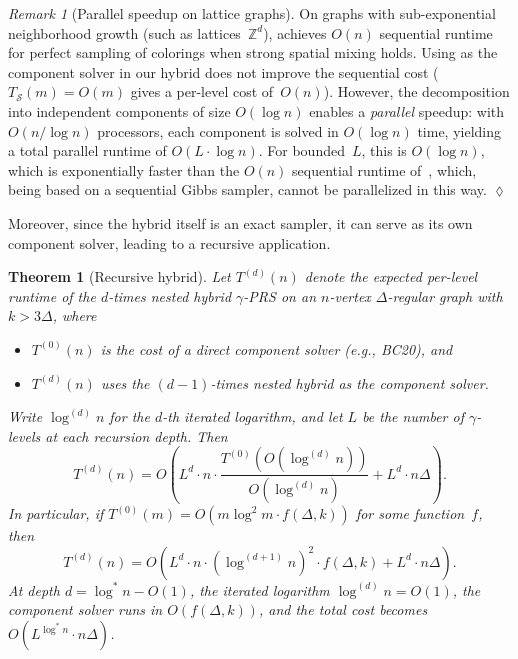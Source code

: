 \documentclass[12pt, a4paper]{article}
\theoremstyle{plain}
\newtheorem{theorem}{Theorem}
\theoremstyle{definition}
\theoremstyle{remark}
\newtheorem{remark}{Remark}
\newcommand{\intg}{\mathbb{Z}}
\newcommand{\mc}{\mathcal}
\newcommand{\lt}{\left}
\newcommand{\rt}{\right}
\begin{document}
\begin{remark}[Parallel speedup on lattice graphs]\normalfont\label{rem:lattice-parallel}
On graphs with sub-exponential neighborhood growth (such as lattices~\(\intg^d\)), \cite{FGY22} achieves \(O(n)\) sequential runtime for perfect sampling of colorings when strong spatial mixing holds. Using \cite{FGY22} as the component solver in our hybrid does not improve the sequential cost (\(T_{\mc S}(m)=O(m)\) gives a per-level cost of~\(O(n)\)). However, the decomposition into independent components of size \(O(\log n)\) enables a {\em parallel} speedup: with \(O(n/\log n)\) processors, each component is solved in \(O(\log n)\) time, yielding a total parallel runtime of \(O(L\cdot\log n)\). For bounded~\(L\), this is \(O(\log n)\), which is exponentially faster than the \(O(n)\) sequential runtime of~\cite{FGY22}, which, being based on a sequential Gibbs sampler, cannot be parallelized in this way.
\hfill\(\lozenge\)
\end{remark}

Moreover, since the hybrid itself is an exact sampler, it can serve as its own component solver, leading to a recursive application.

\begin{theorem}[Recursive hybrid]\label{thm:recursive-hybrid}
Let \(T^{(d)}(n)\) denote the expected per-level runtime of the \(d\)-times nested hybrid \(\gamma\)-PRS on an \(n\)-vertex \(\Delta\)-regular graph with \(k>3\Delta\), where
\begin{itemize}
\item \(T^{(0)}(n)\) is the cost of a direct component solver (e.g., BC20), and
\item \(T^{(d)}(n)\) uses the \((d-1)\)-times nested hybrid as the component solver.
\end{itemize}
Write \(\log^{(d)} n\) for the \(d\)-th iterated logarithm, and let \(L\) be the number of \(\gamma\)-levels at each recursion depth. Then
\[
T^{(d)}(n) = O\!\lt(L^d\cdot n\cdot\frac{T^{(0)}\!\lt(O(\log^{(d)} n)\rt)}{O(\log^{(d)} n)} + L^d\cdot n\Delta\rt).
\]
In particular, if \(T^{(0)}(m)=O(m\log^2 m\cdot f(\Delta,k))\) for some function~\(f\), then
\[
T^{(d)}(n) = O\!\lt(L^d\cdot n\cdot\lt(\log^{(d+1)} n\rt)^2\cdot f(\Delta,k) + L^d\cdot n\Delta\rt).
\]
At depth \(d=\log^* n - O(1)\), the iterated logarithm \(\log^{(d)} n = O(1)\), the component solver runs in \(O(f(\Delta,k))\), and the total cost becomes \(O(L^{\log^* n}\cdot n\Delta)\).
\end{theorem}
\end{document}
